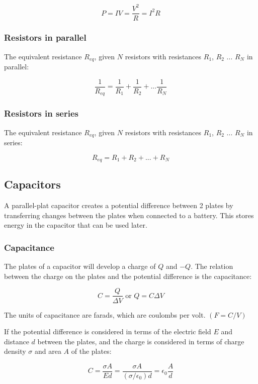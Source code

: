 \documentclass[12pt]{article}
\begin{document}
\[
\boxed{
P = IV = \frac{V^2}{R} = I^2 R
}
\]

\subsubsection{Resistors in parallel}

The equivalent resistance $R_{eq}$, given $N$ resistors with resistances $R_1$, $R_2$ ... $R_N$ in parallel:

\[
\boxed{
\frac{1}{R_{eq}} = \frac{1}{R_1} + \frac{1}{R_2} + ... \frac{1}{R_N}
}
\]

\newpage

\subsubsection{Resistors in series}

The equivalent resistance $R_{eq}$, given $N$ resistors with resistances $R_1$, $R_2$ ... $R_N$ in series:

\[
\boxed{
R_{eq} = R_1 + R_2 + ... + R_N
}
\]

\subsection{Capacitors}

A parallel-plat capacitor creates a potential difference between 2 plates by transferring changes between the plates when connected to a battery.
This stores energy in the capacitor that can be used later.

\subsubsection{Capacitance}

The plates of a capacitor will develop a charge of $Q$ and $-Q$.
The relation between the charge on the plates and the potential difference is the capacitance:

\[
\boxed{
C = \frac{Q}{\Delta V}
}\text{ or }
\boxed{Q = C \Delta V}
\]

The units of capacitance are farads, which are coulombs per volt. $(F = C/V)$

If the potential difference is considered in terms of the electric field $E$ and distance $d$ between the plates, and the charge is considered in terms of charge density $\sigma$ and area $A$ of the plates:

\[
\boxed{
C = \frac{\sigma A}{Ed} = \frac{\sigma A}{(\sigma / \epsilon_0) d} =\epsilon_0 \frac{A}{d}
}
\]
\end{document}

